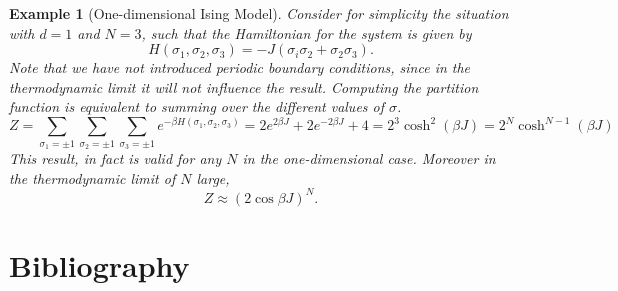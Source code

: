 \documentclass[]{article}
\numberwithin{equation}{section}
\theoremstyle{break}
\newtheorem*{example}{Example}
\begin{document}
\begin{example}[One-dimensional Ising Model]
Consider for simplicity the situation with $d=1$ and $N = 3$, such that the Hamiltonian for the system is given by \cite{cipra-1987}
\[H(\sigma_1, \sigma_2, \sigma_3) = -J(\sigma_i\sigma_2 + \sigma_2\sigma_3).\]
Note that we have not introduced periodic boundary conditions, since in the thermodynamic limit it will not influence the result. Computing the partition function is equivalent to summing over the different values of $\sigma$.
\[Z = \sum_{\sigma_1=\pm1}\sum_{\sigma_2 = \pm1}\sum_{\sigma_3=\pm1}e^{-\beta H(\sigma_1, \sigma_2, \sigma_3)} = 2e^{2\beta J} + 2e^{-2\beta J} + 4 = 2^3\cosh^2(\beta J) = 2^N\cosh^{N-1}(\beta J)\]
This result, in fact is valid for any $N$ in the one-dimensional case. Moreover in the thermodynamic limit of $N$ large,
\begin{equation}
Z \approx (2\cos\beta J)^N.
\label{eq:1d_Z}
\end{equation}
    
\end{example}

\newpage
\section*{Bibliography}
\printbibliography[heading=none]
\end{document}
